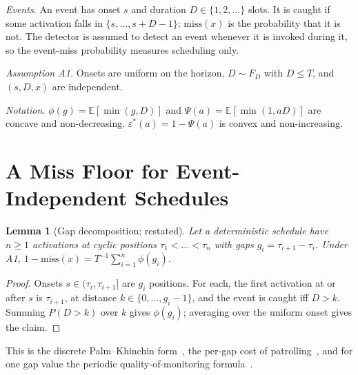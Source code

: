 \documentclass[lettersize,journal]{IEEEtran}
\newtheorem{lemma}{Lemma}
\theoremstyle{definition}
\theoremstyle{remark}
\newcommand{\eps}{\varepsilon}
\newcommand{\Psif}{\Psi}
\newcommand{\E}{\mathbb{E}}
\begin{document}
\emph{Events.} An event has onset $s$ and duration $D\in\{1,2,\dots\}$ slots. It is caught if some activation falls in $\{s,\dots,s+D-1\}$; $\mathrm{miss}(x)$ is the probability that it is not. The detector is assumed to detect an event whenever it is invoked during it, so the event-miss probability measures scheduling only.

\emph{Assumption A1.} Onsets are uniform on the horizon, $D\sim F_D$ with $D\le T$, and $(s,D,x)$ are independent.

\emph{Notation.} $\phi(g)=\E[\min(g,D)]$ and $\Psif(a)=\E[\min(1,aD)]$ are concave and non-decreasing. $\eps^*(a)=1-\Psif(a)$ is convex and non-increasing.

\section{A Miss Floor for Event-Independent Schedules}\label{sec:floor}
\begin{lemma}[Gap decomposition; restated]\label{lem:gap}
Let a deterministic schedule have $n\ge1$ activations at cyclic positions $\tau_1<\dots<\tau_n$ with gaps $g_i=\tau_{i+1}-\tau_i$. Under A1, $1-\mathrm{miss}(x)=T^{-1}\sum_{i=1}^n\phi(g_i)$.
\end{lemma}
\begin{proof}
Onsets $s\in(\tau_i,\tau_{i+1}]$ are $g_i$ positions. For each, the first activation at or after $s$ is $\tau_{i+1}$, at distance $k\in\{0,\dots,g_i-1\}$, and the event is caught iff $D>k$. Summing $P(D>k)$ over $k$ gives $\phi(g_i)$; averaging over the uniform onset gives the claim.
\end{proof}
\noindent This is the discrete Palm--Khinchin form~\cite{daley2003pp1}, the per-gap cost of patrolling~\cite{lin2013opre}, and for one gap value the periodic quality-of-monitoring formula~\cite[Thm.~4.2]{yau2010tosn}.
\end{document}
